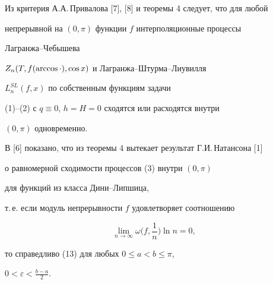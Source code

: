  


\begin{note} 


Из критерия А.А.\,Привалова [7], [8] и теоремы 4 следует, что для любой 


непрерывной на $(0,\pi)$ функции $f$ интерполяционные процессы 


Лагранжа--Чебышева 


$Z_n(T,\linebreak f(\arccos\cdot),\cos x)$ и Лагранжа--Штурма--Лиувилля 


$L^{SL}_n(f,x)$ по собственным функциям задачи 


(1)--(2) с $q\equiv0$, $h=H=0$ сходятся или расходятся внутри 


$(0,\pi)$ одновременно. 


\end{note} 


 


\begin{cornonum} 


В [6] показано, что из теоремы 4 вытекает результат Г.И.\,Натансона [1] 


о равномерной сходимости процессов (3) внутри $(0,\pi)$ 


для функций из класса Дини--Липшица, 


т.\,е. если модуль непрерывности $f$ удовлетворяет соотношению 


$$ 


\lim_{n\to\infty}\omega\bigg(f,\frac{1}{n}\bigg)\ln n=0, 


$$ 


то справедливо (13) для любых $0\le a<b\le\pi$, 


$0<\varepsilon<\frac{b-a}{2}$. 


\end{cornonum} 


 


